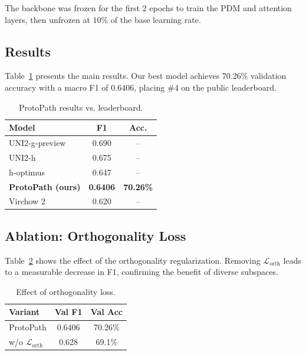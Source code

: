 \documentclass[11pt,twocolumn]{article}
\begin{document}
The backbone was frozen for the first 2 epochs to train the PDM and attention layers, then unfrozen at $10\%$ of the base learning rate.

\subsection{Results}

Table~\ref{tab:results} presents the main results. Our best model achieves 70.26\% validation accuracy with a macro F1 of 0.6406, placing \#4 on the public leaderboard.

\begin{table}[t]
    \centering
    \caption{ProtoPath results vs. leaderboard.}
    \label{tab:results}
    \begin{tabular}{lcc}
        \toprule
        Model & F1 & Acc. \\
        \midrule
        UNI2-g-preview & 0.690 & -- \\
        UNI2-h & 0.675 & -- \\
        h-optimus & 0.647 & -- \\
        \textbf{ProtoPath (ours)} & \textbf{0.6406} & \textbf{70.26\%} \\
        Virchow 2 & 0.620 & -- \\
        \bottomrule
    \end{tabular}
\end{table}

\subsection{Ablation: Orthogonality Loss}

Table~\ref{tab:orth} shows the effect of the orthogonality regularization. Removing $\mathcal{L}_{\text{orth}}$ leads to a measurable decrease in F1, confirming the benefit of diverse subspaces.

\begin{table}[t]
    \centering
    \caption{Effect of orthogonality loss.}
    \label{tab:orth}
    \begin{tabular}{lcc}
        \toprule
        Variant & Val F1 & Val Acc \\
        \midrule
        ProtoPath & 0.6406 & 70.26\% \\
        w/o $\mathcal{L}_{\text{orth}}$ & 0.628 & 69.1\% \\
        \bottomrule
    \end{tabular}
\end{table}
\end{document}
